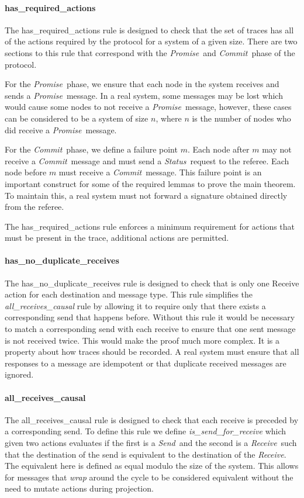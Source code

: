 \documentclass[runningheads]{llncs}
\newcommand{\send}{\emph{Send}}
\newcommand{\receive}{\emph{Receive}}
\newcommand{\promise}{\emph{Promise}}
\newcommand{\commit}{\emph{Commit}}
\newcommand{\status}{\emph{Status}}
\begin{document}
\paragraph{has\_required\_actions}
The has\_required\_actions rule is designed to check that the set of traces has all of the actions required by the protocol for a system of a given size. There are two sections to this rule that correspond with the \promise\ and \commit\ phase of the protocol. 

For the \promise\ phase, we ensure that each node in the system receives and sends a \promise\ message. In a real system, some messages may be lost which would cause some nodes to not receive a \promise\ message, however, these cases can be considered to be a system of size $n$, where $n$ is the number of nodes who did receive a \promise\ message. 

For the \commit\ phase, we define a failure point $m$. Each node after $m$ may not receive a \commit\ message and must send a \status\ request to the referee. Each node before $m$ must receive a \commit\ message. This failure point is an important construct for some of the required lemmas to prove the main theorem. To maintain this, a real system must not forward a signature obtained directly from the referee. 

The has\_required\_actions rule enforces a minimum requirement for actions that must be present in the trace, additional actions are permitted.

\paragraph{has\_no\_duplicate\_receives}
The has\_no\_duplicate\_receives rule is designed to check that is only one Receive action for each destination and message type. This rule simplifies the \emph{all\_receives\_causal} rule by allowing it to require only that there exists a corresponding send that happens before. Without this rule it would be necessary to match a corresponding send with each receive to ensure that one sent message is not received twice. This would make the proof much more complex. It is a property about how traces should be recorded. A real system must ensure that all responses to a message are idempotent or that duplicate received messages are ignored. 

\paragraph{all\_receives\_causal}
The all\_receives\_causal rule is designed to check that each receive is preceded by a corresponding send. To define this rule we define \sloppy \emph{is\_send\_for\_receive} which given two actions evaluates if the first is a \send\ and the second is a \receive\ such that the destination of the send is equivalent to the destination of the \receive. The equivalent here is defined as equal modulo the size of the system. This allows for messages that \emph{wrap} around the cycle to be considered equivalent without the need to mutate actions during projection. 
\end{document}
